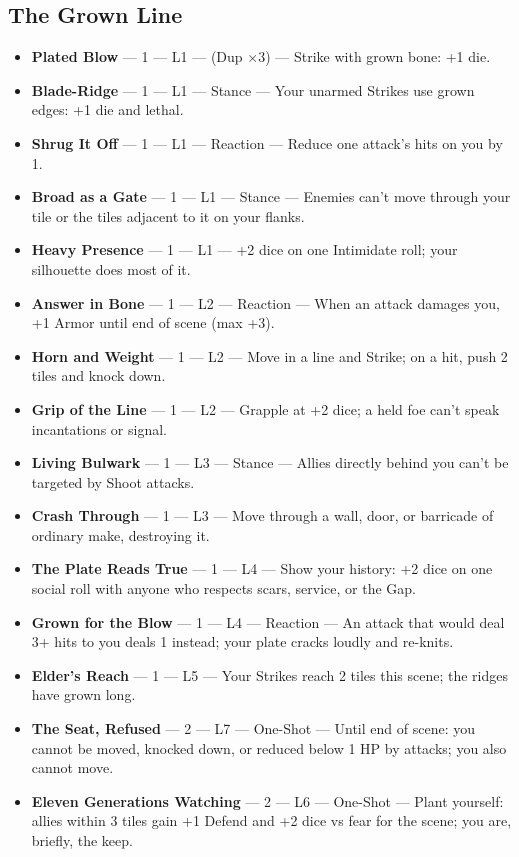 \subsection{The Grown Line}
\begin{itemize}
    \item \textbf{Plated Blow} --- 1 --- L1 --- (Dup ×3) --- Strike with grown bone: +1 die.
    \item \textbf{Blade-Ridge} --- 1 --- L1 --- Stance --- Your unarmed Strikes use grown edges: +1 die and lethal.
    \item \textbf{Shrug It Off} --- 1 --- L1 --- Reaction --- Reduce one attack's hits on you by 1.
    \item \textbf{Broad as a Gate} --- 1 --- L1 --- Stance --- Enemies can't move through your tile or the tiles adjacent to it on your flanks.
    \item \textbf{Heavy Presence} --- 1 --- L1 --- +2 dice on one Intimidate roll; your silhouette does most of it.
    \item \textbf{Answer in Bone} --- 1 --- L2 --- Reaction --- When an attack damages you, +1 Armor until end of scene (max +3).
    \item \textbf{Horn and Weight} --- 1 --- L2 --- Move in a line and Strike; on a hit, push 2 tiles and knock down.
    \item \textbf{Grip of the Line} --- 1 --- L2 --- Grapple at +2 dice; a held foe can't speak incantations or signal.
    \item \textbf{Living Bulwark} --- 1 --- L3 --- Stance --- Allies directly behind you can't be targeted by Shoot attacks.
    \item \textbf{Crash Through} --- 1 --- L3 --- Move through a wall, door, or barricade of ordinary make, destroying it.
    \item \textbf{The Plate Reads True} --- 1 --- L4 --- Show your history: +2 dice on one social roll with anyone who respects scars, service, or the Gap.
    \item \textbf{Grown for the Blow} --- 1 --- L4 --- Reaction --- An attack that would deal 3+ hits to you deals 1 instead; your plate cracks loudly and re-knits.
    \item \textbf{Elder's Reach} --- 1 --- L5 --- Your Strikes reach 2 tiles this scene; the ridges have grown long.
    \item \textbf{The Seat, Refused} --- 2 --- L7 --- One-Shot --- Until end of scene: you cannot be moved, knocked down, or reduced below 1 HP by attacks; you also cannot move.
    \item \textbf{Eleven Generations Watching} --- 2 --- L6 --- One-Shot --- Plant yourself: allies within 3 tiles gain +1 Defend and +2 dice vs fear for the scene; you are, briefly, the keep.
\end{itemize}

